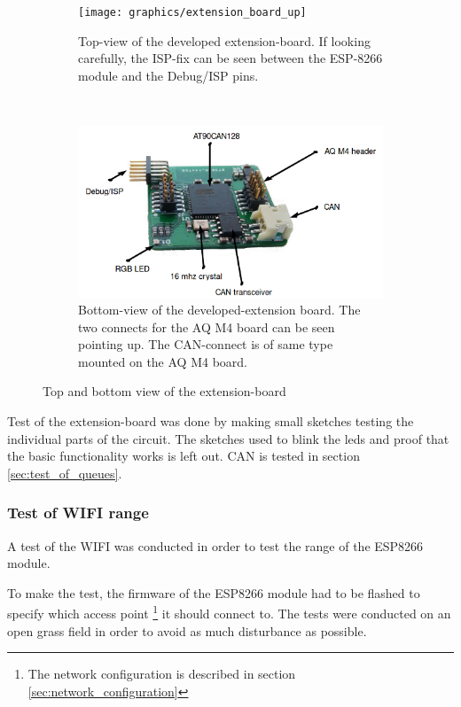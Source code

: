 \begin{figure}[H]
    \centering
    \begin{subfigure}[b]{0.45\textwidth}
        \texttt{[image: graphics/extension\_board\_up]}
        \caption{Top-view of the developed extension-board. If looking carefully, the ISP-fix can be seen between the ESP-8266 module and the Debug/ISP pins.}
        \label{fig:extension_board_up}
    \end{subfigure}
    ~ 
    \begin{subfigure}[b]{0.51\textwidth}
        \includegraphics[width=\textwidth]{graphics/extension_board_down}
        \caption{Bottom-view of the developed-extension board. The two connects for the AQ M4 board can be seen pointing up. The CAN-connect is of same type mounted on the AQ M4 board.}
        \label{fig:extension_board_down}
    \end{subfigure}
    \caption{Top and bottom view of the extension-board}\label{fig:extension_board}
\end{figure}

Test of the extension-board was done by making small sketches testing the individual parts of the circuit. The sketches used to blink the leds and proof that the basic functionality works is left out. CAN is tested in section \ref{sec:test_of_queues}.

\subsubsection*{Test of WIFI range}
A test of the WIFI was conducted in order to test the range of the ESP8266 module. 

To make the test, the firmware of the ESP8266 module had to be flashed to specify which access point \footnote{The network configuration is described in  section \ref{sec:network_configuration}} it should connect to.
The tests were conducted on an open grass field in order to avoid as much disturbance as possible.

